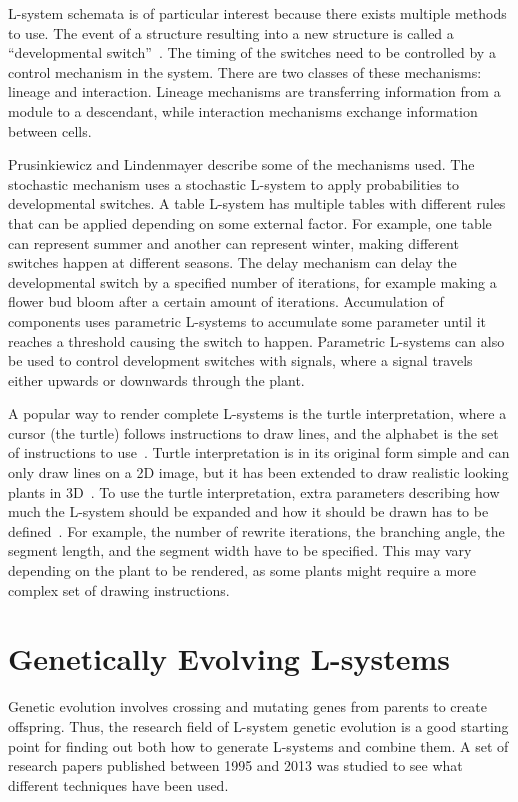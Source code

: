 \gls{L-system} schemata is of particular interest because there exists multiple methods to use.
The event of a structure resulting into a new structure is called a ``developmental switch''~\cite{2012Prusinkiewicz}.
The timing of the switches need to be controlled by a control mechanism in the system.
There are two classes of these mechanisms: lineage and interaction.
Lineage mechanisms are transferring information from a module to a descendant, while interaction mechanisms exchange information between cells.

Prusinkiewicz and Lindenmayer describe some of the mechanisms used.
The stochastic mechanism uses a stochastic \gls{L-system} to apply probabilities to developmental switches.
A table \gls{L-system} has multiple tables with different rules that can be applied depending on some external factor.
For example, one table can represent summer and another can represent winter, making different switches happen at different seasons.
The delay mechanism can delay the developmental switch by a specified number of iterations, for example making a flower bud bloom after a certain amount of iterations.
Accumulation of components uses parametric \glspl{L-system} to accumulate some parameter until it reaches a threshold causing the switch to happen.
Parametric \glspl{L-system} can also be used to control development switches with signals, where a signal travels either upwards or downwards through the plant.~\cite{2012Prusinkiewicz}

A popular way to render complete \glspl{L-system} is the turtle interpretation, where a cursor (the turtle) follows instructions to draw lines, and the alphabet is the set of instructions to use~\cite{2012Prusinkiewicz}.
Turtle interpretation is in its original form simple and can only draw lines on a 2D image, but it has been extended to draw realistic looking plants in 3D~\cite{2012Prusinkiewicz}.
To use the turtle interpretation, extra parameters describing how much the \gls{L-system} should be expanded and how it should be drawn has to be defined~\cite{2012Prusinkiewicz}.
For example, the number of rewrite iterations, the branching angle, the segment length, and the segment width have to be specified.
This may vary depending on the plant to be rendered, as some plants might require a more complex set of drawing instructions.

\section{Genetically Evolving L-systems}
Genetic evolution involves crossing and mutating genes from parents to create offspring.
Thus, the research field of \gls{L-system} genetic evolution is a good starting point for finding out both how to generate \glspl{L-system} and combine them.
A set of research papers published between 1995 and 2013 was studied to see what different techniques have been used.

